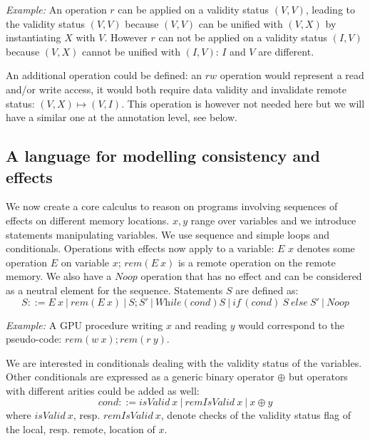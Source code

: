 \documentclass[preprint,12pt]{elsarticle}
\newcommand{\symb}[1]{\textit{#1}}
\newcommand{\noop}{\symb{Noop}}
\newcommand{\while}{\symb{While}}
\newcommand{\cond}{\symb{cond}}
\newcommand{\isvalid}{\symb{isValid}}
\newcommand{\isremvalid}{\symb{remIsValid}}
\newcommand{\rem}[1]{\symb{rem}(#1)}
\newcommand{\IF}[3]{\symb{if}\,(#1)~#2~\symb{else}~#3 }
\newenvironment{example}{\smallskip\par\noindent\emph{Example:}}{\medskip}
\begin{document}
\begin{example}
An operation $r$ can be applied on a validity status $(V,V)$, leading to the validity status $(V,V)$ because $(V,V)$ can be unified with $(V,X)$ by instantiating $X$ with $V$. However $r$ can not be applied on a validity status $(I,V)$ because $(V,X)$ cannot be unified with $(I,V)$: $I$ and $V$ are different.
\end{example}

An additional operation could be defined: 
 an 
$rw$ operation would represent a read and/or write access, it would both require data 
validity and invalidate 
remote status: $(V,X)\mapsto (V,I)$. This operation is however not needed here but we will have a similar one at the annotation level, see below.

\subsection{A language for modelling consistency and effects}\label{sec-core}
We now create a core calculus to  reason on programs involving sequences of 
effects on different memory locations. $x,y$ range over variables and we introduce  statements manipulating 
variables. We use sequence and simple loops and conditionals. 
Operations with effects 
now apply to a variable: $E$ $x$ denotes some operation $E$ on variable $x$;   $\rem{E~x}$  is a remote operation 
 on the remote memory. We also have a $\noop$ operation that has no effect and can be considered as a neutral element for the sequence.
Statements $S$ are defined as:
{\small \[S::=E~x~|~\rem{E~x}~|~S;S'~|~\while(\cond) S ~|~ \IF{\cond}{S}{S'}~|~\noop\]}
\vspace{-3.5ex}
\begin{example}
A GPU procedure 
writing $x$ and reading $y$ would correspond to the pseudo-code: $\rem{w~x};\rem{r~y}$. \end{example}

We are  interested  in conditionals dealing 
with the validity status of the variables. Other conditionals  are expressed as a generic 
binary operator $\oplus$ but  operators with different arities could be added as 
well:
\[\cond::=\isvalid~x~|~\isremvalid~x~|~x\oplus y\]
\noindent where $\isvalid~x$, resp. $\isremvalid~x$,  denote checks of the validity status flag of the local, resp. remote, location of $x$.
\end{document}
